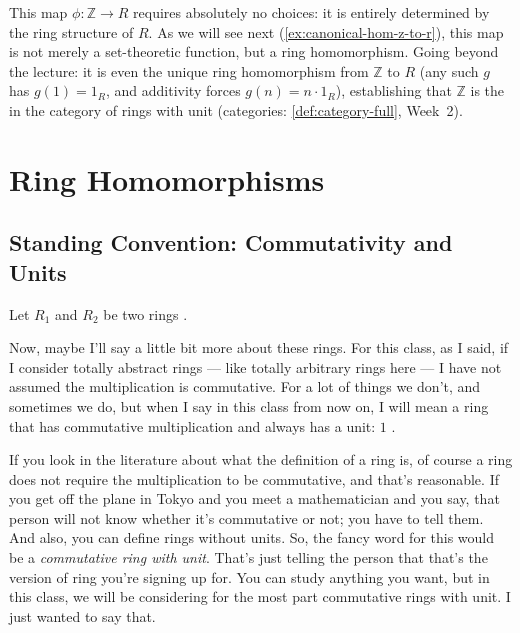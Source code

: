\begin{content}
\begin{steps}
This map $\phi \colon \mathbb{Z} \to R$ requires absolutely no choices: it is entirely determined by the ring structure of $R$. As we will see next (\cref{ex:canonical-hom-z-to-r}), this map is not merely a set-theoretic function, but a ring homomorphism. Going beyond the lecture: it is even the unique ring homomorphism from $\mathbb{Z}$ to $R$ (any such $g$ has $g(1) = 1_R$, and additivity forces $g(n) = n \cdot 1_R$), establishing that $\mathbb{Z}$ is the  in the category of rings with unit (categories: \cref{def:category-full}, Week~2).
\end{steps}
\end{content}

\begin{hidden}
\end{hidden}

\section{Ring Homomorphisms}
\subsection{Standing Convention: Commutativity and Units}

\begin{speech}[00:17:10 - 00:18:44]
Let $R_1$ and $R_2$ be two rings .

Now, maybe I'll say a little bit more about these rings. For this class, as I said, if I consider totally abstract rings --- like totally arbitrary rings here  --- I have not assumed the multiplication is commutative. For a lot of things we don't, and sometimes we do, but when I say  in this class from now on, I will mean a ring that has commutative multiplication  and always has a unit: $1$ .

If you look in the literature about what the definition of a ring is, of course a ring does not require the multiplication to be commutative, and that's reasonable. If you get off the plane in Tokyo and you meet a mathematician and you say,  that person will not know whether it's commutative or not; you have to tell them. And also, you can define rings without units. So, the fancy word for this would be a \emph{commutative ring with unit}. That's just telling the person that that's the version of ring you're signing up for. You can study anything you want, but in this class, we will be considering for the most part commutative rings with unit. I just wanted to say that.
\end{speech}

